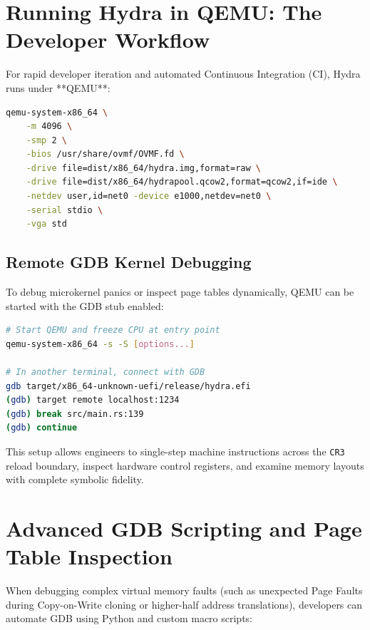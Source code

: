 \section{Running Hydra in QEMU: The Developer Workflow}
\label{sec:qemu_workflow}

For rapid developer iteration and automated Continuous Integration (CI), Hydra runs under **QEMU**:

\begin{lstlisting}[language=bash, caption={Launching Hydra under QEMU}]
qemu-system-x86_64 \
    -m 4096 \
    -smp 2 \
    -bios /usr/share/ovmf/OVMF.fd \
    -drive file=dist/x86_64/hydra.img,format=raw \
    -drive file=dist/x86_64/hydrapool.qcow2,format=qcow2,if=ide \
    -netdev user,id=net0 -device e1000,netdev=net0 \
    -serial stdio \
    -vga std
\end{lstlisting}

\subsection{Remote GDB Kernel Debugging}
To debug microkernel panics or inspect page tables dynamically, QEMU can be started with the GDB stub enabled:
\begin{lstlisting}[language=bash, caption={Debugging with QEMU and GDB}]
# Start QEMU and freeze CPU at entry point
qemu-system-x86_64 -s -S [options...]

# In another terminal, connect with GDB
gdb target/x86_64-unknown-uefi/release/hydra.efi
(gdb) target remote localhost:1234
(gdb) break src/main.rs:139
(gdb) continue
\end{lstlisting}

This setup allows engineers to single-step machine instructions across the \texttt{CR3} reload boundary, inspect hardware control registers, and examine memory layouts with complete symbolic fidelity.

\section{Advanced GDB Scripting and Page Table Inspection}
\label{sec:gdb_scripting}

When debugging complex virtual memory faults (such as unexpected Page Faults during Copy-on-Write cloning or higher-half address translations), developers can automate GDB using Python and custom macro scripts:

